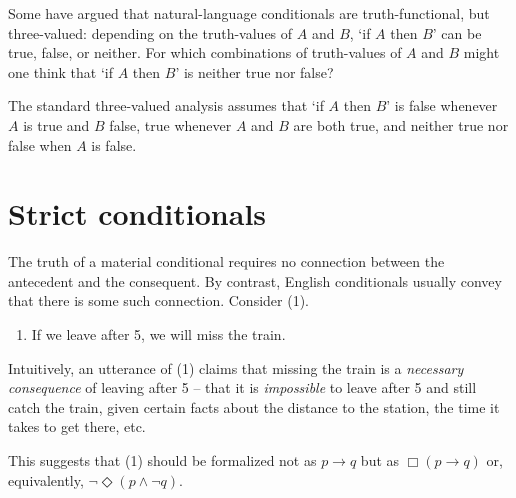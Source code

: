 \begin{exercise}
  Some have argued that natural-language conditionals are truth-functional, but
  three-valued: depending on the truth-values of $A$ and $B$, `if $A$ then $B$'
  can be true, false, or neither. For which combinations of truth-values of $A$
  and $B$ might one think that `if $A$ then $B$' is neither true nor false?
\end{exercise}
\begin{solution}
  The standard three-valued analysis assumes that `if $A$ then $B$' is false
  whenever $A$ is true and $B$ false, true whenever $A$ and $B$ are both true,
  and neither true nor false when $A$ is false.
\end{solution}


\section{Strict conditionals}\label{sec:strict-implication}


The truth of a material conditional requires no connection between the
antecedent and the consequent. By contrast, English conditionals usually convey
that there is some such connection. Consider (1).
\begin{enumerate}[leftmargin=10mm]
  \item[(1)] If we leave after 5, we will miss the train.
\end{enumerate}
Intuitively, an utterance of (1) claims that missing the train is a
\emph{necessary consequence} of leaving after 5 -- that it is \emph{impossible}
to leave after 5 and still catch the train, given certain facts about the
distance to the station, the time it takes to get there, etc.

This suggests that (1) should be formalized not as $p \to q$ but as
$\Box(p \to q)$ or, equivalently, $\neg \Diamond(p \land \neg q)$.

